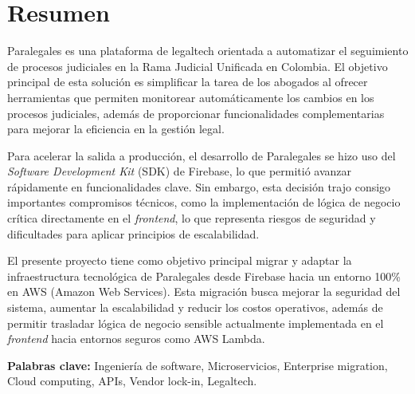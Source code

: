 \section*{Resumen}

Paralegales es una plataforma de legaltech orientada a automatizar el seguimiento de procesos judiciales en la Rama Judicial Unificada en Colombia. El objetivo principal de esta solución es simplificar la tarea de los abogados al ofrecer herramientas que permiten monitorear automáticamente los cambios en los procesos judiciales, además de proporcionar funcionalidades complementarias para mejorar la eficiencia en la gestión legal.

Para acelerar la salida a producción, el desarrollo de Paralegales se hizo uso del \textit{Software Development Kit} (SDK) de Firebase, lo que permitió avanzar rápidamente en funcionalidades clave. Sin embargo, esta decisión trajo consigo importantes compromisos técnicos, como la implementación de lógica de negocio crítica directamente en el \textit{frontend}, lo que representa riesgos de seguridad y dificultades para aplicar principios de escalabilidad.

El presente proyecto tiene como objetivo principal migrar y adaptar la infraestructura tecnológica de Paralegales desde Firebase hacia un entorno 100\% en AWS (Amazon Web Services). Esta migración busca mejorar la seguridad del sistema, aumentar la escalabilidad y reducir los costos operativos, además de permitir trasladar lógica de negocio sensible actualmente implementada en el \textit{frontend} hacia entornos seguros como AWS Lambda.

\hfill

\textbf{Palabras clave:}  Ingeniería de software, Microservicios, Enterprise migration, Cloud computing, APIs, Vendor lock-in, Legaltech.
